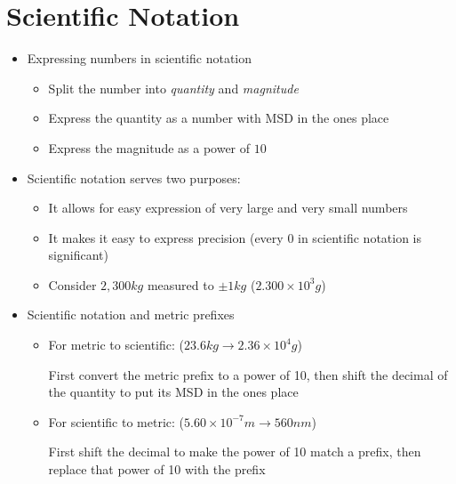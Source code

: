 \documentclass[12pt, openany, letterpaper]{memoir}
\begin{document}
\section{Scientific Notation}
\begin{itemize}
	\item Expressing numbers in scientific notation
	\begin{itemize}
		\item Split the number into \emph{quantity} and \emph{magnitude}
		\item Express the quantity as a number with MSD in the ones place
		\item Express the magnitude as a power of $10$
	\end{itemize}
	\item Scientific notation serves two purposes:
	\begin{itemize}
		\item It allows for easy expression of very large and very small numbers
		\item It makes it easy to express precision (every $0$ in scientific notation is significant)
		\item Consider $2,300kg$ measured to $\pm1kg$ ($2.300\times10^3g$)
	\end{itemize}
	\item Scientific notation and metric prefixes
	\begin{itemize}
		\item For metric to scientific: ($23.6kg\rightarrow2.36\times10^4g$)
		
		First convert the metric prefix to a power of 10, then shift the decimal of the quantity to put its MSD in the ones place
		\item For scientific to metric: ($5.60\times10^{-7}m\rightarrow560nm$)
		
		First shift the decimal to make the power of 10 match a prefix, then replace that power of 10 with the prefix
	\end{itemize}
\end{itemize}
\end{document}
